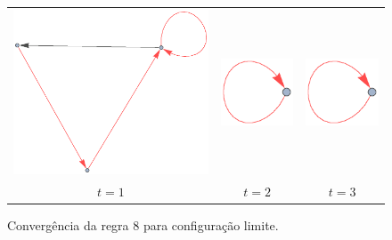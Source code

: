 \documentclass[12pt,a4paper]{article}
\begin{document}
\begin{figure}[htp]
\begin{tabular}{c c c}
\includegraphics[scale=0.5]{img/8/1.eps} &
\includegraphics[scale=0.5]{img/8/limit.eps} &
\includegraphics[scale=0.5]{img/8/limit.eps}  \\
$t = 1$ & $t = 2$ & $t = 3$ \\
\end{tabular}
\caption{Convergência da regra 8 para configuração limite.}
\label{fig:gp8}
\end{figure}
\end{document}
